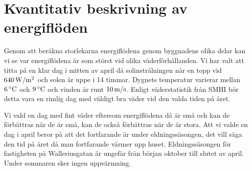 \section{Kvantitativ beskrivning av energiflöden}

Genom att beräkna storlekarna energiflödena genom byggnadens olika delar kan vi se var energiflödena är som störst vid olika väderförhållanden. Vi har valt att titta på en klar dag i mitten av april då solinstrålningen når en topp vid $\unit[640]{W/m^2}$ och solen är uppe i 14 timmar. Dygnets temperatur varierar mellan $\unit[6]{^\circ C}$ och $\unit[9]{^\circ C}$ och vinden är runt $\unit[10]{m/s}$. Enligt väderstatistik från SMHI bör detta vara en rimlig dag med väldigt bra väder vid den valda tiden på året.

Vi vald en dag med fint väder eftersom energiflödena då är små och kan de förbättras när de är små, kan de också förbättras när de är stora. Att vi valde en dag i april beror på att det fortfarande är under eldningssäsongen, det vill säga den tid på året då man fortfarande värmer upp huset. Eldningssäsongen för fastigheten på Walleriusgatan är ungefär från början oktober till slutet av april. Under sommaren sker ingen uppvärmning.








